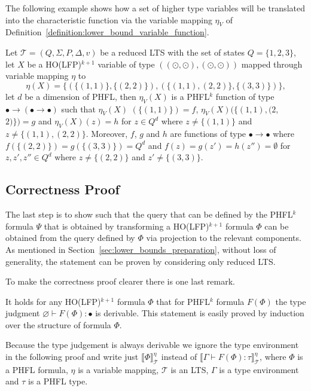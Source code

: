 The following example shows how a set of higher type variables will be translated into the characteristic function via the
variable mapping $\eta_V$ of Definition~\ref{definition:lower_bound_variable_function}.

\begin{example}
    Let $\mathcal{T} = (Q, \Sigma, P, \Delta, v)$ be a reduced LTS with the set of states $Q = \{1, 2, 3\}$, let $X$ be a HO(LFP)$^{k + 1}$
    variable of type $((\odot, \odot), (\odot, \odot))$ mapped through variable mapping $\eta$ to
    \[\eta(X) = \{(\{(1, 1)\}, \{(2, 2)\}), (\{(1, 1), (2, 2)\}, \{(3, 3)\})\},\]
    let $d$ be a dimension of PHFL, then $\eta_V(X)$ is a PHFL$^k$ function of type $\bullet \rightarrow (\bullet \rightarrow \bullet)$ such
    that $\eta_V(X)$ $(\{(1, 1)\}) = f$, $\eta_V(X)(\{(1, 1), (2, $ $2)\}) = g$ and $\eta_V(X)(z) = h$ for $z \in
    Q^d$ where $z \neq \{(1, 1)\}$ and $z \neq \{(1, 1), (2, 2)\}$. Moreover, $f$, $g$ and $h$ are functions of type $\bullet
    \rightarrow \bullet$ where $f(\{(2, 2)\}) = g(\{(3, 3)\}) = Q^d$ and $f(z) = g(z') = h(z'') = \emptyset$ for $z,
    z', z'' \in Q^d$ where $z \neq \{(2, 2)\}$ and $z' \neq \{(3, 3)\}$.
\end{example}

\subsection{Correctness Proof}\label{subsec:lower_bounds_correctness_lfp}

The last step is to show such that the query that can be defined by the PHFL$^k$ formula $\Psi$ that is obtained by transforming a HO(LFP)$^{k+1}$ formula $\Phi$ can be obtained from the query defined by $\Phi$ via projection to the relevant components. As mentioned in Section~\ref{sec:lower_bounds_preparation}, without loss of generality, the statement can be proven by considering only reduced LTS. 

To make the correctness proof clearer there is one last remark.

\begin{remark}
    It holds for any HO(LFP)$^{k+1}$ formula $\Phi$ that for PHFL$^k$ formula $F(\Phi)$ the type judgment $\varnothing \vdash
    F(\Phi) \colon \bullet$ is derivable. This statement
    is easily proved by induction over the structure of formula $\Phi$. 
\end{remark}

Because the type judgement is always derivable we ignore the type environment in the following proof and write just $\llbracket \Phi \rrbracket^\eta_\mathcal{T}$ instead of $\llbracket \Gamma \vdash F(\Phi) \colon \tau \rrbracket^\eta_\mathcal{T}$, where $\Phi$ is a PHFL formula, $\eta$ is a variable mapping, $\mathcal{T}$ is an LTS, $\Gamma$ is a type environment and $\tau$ is a PHFL type.

